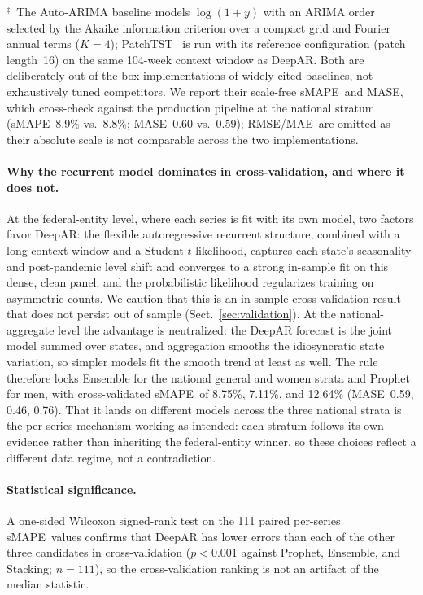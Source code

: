 \documentclass[runningheads]{llncs}
\newcommand{\smape}{sMAPE}
\newcommand{\mase}{MASE}
\newcommand{\rmse}{RMSE}
\newcommand{\mae}{MAE}
\begin{document}
\begin{table}[t]
\smallskip
{\footnotesize $^{\ddagger}$~The Auto-ARIMA baseline models
$\log(1{+}y)$ with an ARIMA order selected by the Akaike information
criterion over a compact grid
and Fourier annual terms ($K{=}4$); PatchTST~\cite{nie2023patchtst} is run with its
reference configuration (patch length~16) on the same 104-week context
window as DeepAR. Both are deliberately out-of-the-box implementations
of widely cited baselines, not exhaustively tuned competitors. We
report their scale-free \smape\ and \mase, which cross-check against
the production pipeline at the national stratum (\smape\ 8.9\% vs.\
8.8\%; \mase\ 0.60 vs.\ 0.59); \rmse/\mae\ are omitted as their
absolute scale is not comparable across the two implementations.}
\end{table}

\paragraph{Why the recurrent model dominates in cross-validation, and where it does not.}
At the federal-entity level, where each series is fit with its own
model, two factors favor DeepAR: the flexible autoregressive recurrent
structure, combined with a long context window and a Student-$t$
likelihood, captures each state's seasonality and post-pandemic level
shift and converges to a strong in-sample fit on this dense, clean
panel; and the probabilistic likelihood regularizes training on
asymmetric counts. We caution that this is an in-sample cross-validation
result that does not persist out of sample (Sect.~\ref{sec:validation}).
At the national-aggregate level the advantage is neutralized: the DeepAR
forecast is the joint model summed over states, and aggregation smooths
the idiosyncratic state variation, so simpler models fit the smooth
trend at least as well. The rule therefore locks Ensemble for the
national general and women strata and Prophet for men, with
cross-validated \smape\ of 8.75\%, 7.11\%, and 12.64\% (\mase\ 0.59,
0.46, 0.76). That it lands on different models across the three national
strata is the per-series mechanism working as intended: each stratum
follows its own evidence rather than inheriting the federal-entity
winner, so these choices reflect a different data regime, not a
contradiction.

\paragraph{Statistical significance.}
A one-sided Wilcoxon signed-rank test on the 111 paired per-series
\smape\ values confirms that DeepAR has lower errors than each of the
other three candidates in cross-validation ($p<0.001$ against Prophet,
Ensemble, and Stacking; $n{=}111$), so the cross-validation ranking is
not an artifact of the median statistic.
\end{document}
